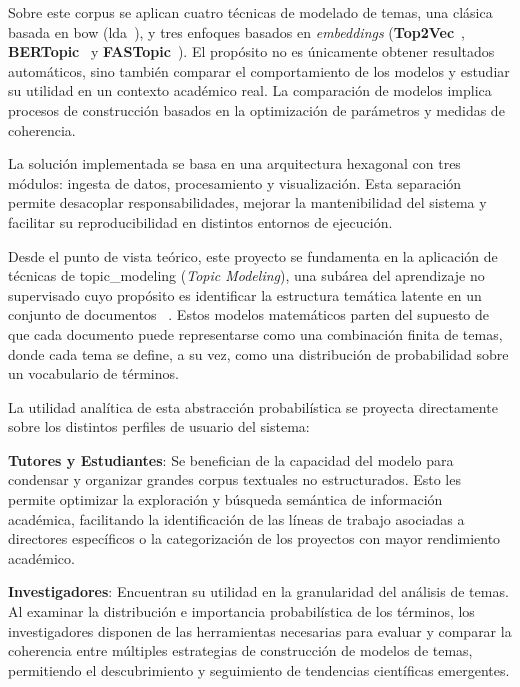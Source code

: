 Sobre este corpus se aplican cuatro técnicas de modelado de temas, una clásica
basada en \acrfull{bow} (\acrfull{lda}~\cite{blei2003lda}), y tres enfoques
basados en \textit{embeddings}
(\textbf{Top2Vec}~\cite{gTop2vecTopicModeling2022},
\textbf{BERTopic}~\cite{grootendorstBERTopicNeuralTopic2022} y
\textbf{FASTopic}~\cite{2024arXiv240517978W}). El propósito no es únicamente
obtener resultados automáticos, sino también comparar el comportamiento de los
modelos y estudiar su utilidad en un contexto académico real. La comparación de
modelos implica procesos de construcción basados en la optimización de
parámetros y medidas de coherencia.

La solución implementada se basa en una arquitectura hexagonal con tres
módulos: ingesta de datos, procesamiento y visualización. Esta separación
permite desacoplar responsabilidades, mejorar la mantenibilidad del sistema y
facilitar su reproducibilidad en distintos entornos de ejecución.

Desde el punto de vista teórico, este proyecto se fundamenta en la aplicación
de técnicas de \gls{topic_modeling} (\textit{Topic Modeling}), una subárea del
aprendizaje no supervisado cuyo propósito es identificar la estructura temática
latente en un conjunto de documentos
~\cite{atkinson-abutridyGrandesModelosLenguaje2023}. Estos modelos matemáticos
parten del supuesto de que cada documento puede representarse como una
combinación finita de temas, donde cada tema se define, a su vez, como una
distribución de probabilidad sobre un vocabulario de términos.

La utilidad analítica de esta abstracción probabilística se proyecta
directamente sobre los distintos perfiles de usuario del sistema:

\textbf{Tutores y Estudiantes}: Se benefician de la capacidad del modelo para condensar
y organizar grandes corpus textuales no estructurados. Esto les permite
optimizar la exploración y búsqueda semántica de información académica,
facilitando la identificación de las líneas de trabajo asociadas a directores
específicos o la categorización de los proyectos con mayor rendimiento
académico.

\textbf{Investigadores}: Encuentran su utilidad en la granularidad del análisis de
temas. Al examinar la distribución e importancia probabilística de los
términos, los investigadores disponen de las herramientas necesarias para
evaluar y comparar la coherencia entre múltiples estrategias de construcción de
modelos de temas, permitiendo el descubrimiento y seguimiento de tendencias
científicas emergentes.

